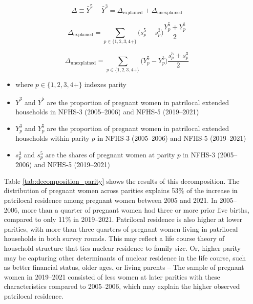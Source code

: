 \documentclass[10pt,twoside,reqno]{article}
\begin{document}
\begin{equation}
\Delta \equiv \bar Y^{5} - \bar Y^{3}
= \Delta_{\text{explained}} + \Delta_{\text{unexplained}}
\end{equation}

\begin{equation}
\Delta_{\text{explained}} =
\sum_{p \in \{1,2,3,4+\}} \big(s_p^{5} - s_p^{3}\big)\frac{Y_p^{5} + Y_p^{3}}{2}
\end{equation}

\begin{equation}
\Delta_{\text{unexplained}} =
\sum_{p \in \{1,2,3,4+\}} \big(Y_p^{5} - Y_p^{3}\big)\frac{s_p^{5} + s_p^{3}}{2}
\end{equation}



\begin{itemize}
    \item where $p \in \{1,2,3,4+\}$ indexes parity
    \item $\bar Y^{3}$ and $\bar Y^{5}$ are the proportion of pregnant women in patrilocal extended households in NFHS-3 (2005--2006) and NFHS-5 (2019--2021)
    \item $Y_p^{3}$ and $Y_p^{5}$ are the proportion of pregnant women in patrilocal extended households within parity $p$ in NFHS-3 (2005--2006) and NFHS-5 (2019--2021)
    \item $s_p^{3}$ and $s_p^{5}$ are the shares of pregnant women at parity $p$ in NFHS-3 (2005--2006) and NFHS-5 (2019--2021)
\end{itemize}

Table \ref{tab:decomposition_parity} shows the results of this decomposition. The distribution of pregnant women across parities explains 53\% of the increase in patrilocal residence among pregnant women between 2005 and 2021. In 2005--2006, more than a quarter of pregnant women had three or more prior live births, compared to only 11\% in 2019--2021. Patrilocal residence is also higher at lower parities, with more than three quarters of pregnant women living in patrilocal households in both survey rounds. This may reflect a life course theory of household structure that ties nuclear residence to family size. Or, higher parity may be capturing other determinants of nuclear residence in the life course, such as better financial status, older ages, or living parents -- The sample of pregnant women in 2019--2021 consisted of less women at later parities with these characteristics compared to 2005--2006, which may explain the higher observed patrilocal residence. 
\end{document}
